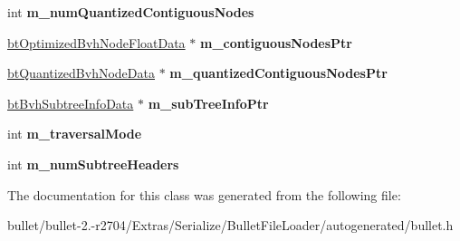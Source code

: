\begin{DoxyCompactItemize}
\item 
\hypertarget{class_bullet_1_1bt_quantized_bvh_float_data_ade2d7f0c45e9d551a5ea19a0a89d8ecf}{int {\bfseries m\+\_\+num\+Quantized\+Contiguous\+Nodes}}\label{class_bullet_1_1bt_quantized_bvh_float_data_ade2d7f0c45e9d551a5ea19a0a89d8ecf}

\item 
\hypertarget{class_bullet_1_1bt_quantized_bvh_float_data_a225ee2777bb0168863155763de4ea4e0}{\hyperlink{class_bullet_1_1bt_optimized_bvh_node_float_data}{bt\+Optimized\+Bvh\+Node\+Float\+Data} $\ast$ {\bfseries m\+\_\+contiguous\+Nodes\+Ptr}}\label{class_bullet_1_1bt_quantized_bvh_float_data_a225ee2777bb0168863155763de4ea4e0}

\item 
\hypertarget{class_bullet_1_1bt_quantized_bvh_float_data_a8ccd5c4aadbeb51c98ec626a0bd9a441}{\hyperlink{class_bullet_1_1bt_quantized_bvh_node_data}{bt\+Quantized\+Bvh\+Node\+Data} $\ast$ {\bfseries m\+\_\+quantized\+Contiguous\+Nodes\+Ptr}}\label{class_bullet_1_1bt_quantized_bvh_float_data_a8ccd5c4aadbeb51c98ec626a0bd9a441}

\item 
\hypertarget{class_bullet_1_1bt_quantized_bvh_float_data_a0315a963aab5135538c08ad21e924bb8}{\hyperlink{class_bullet_1_1bt_bvh_subtree_info_data}{bt\+Bvh\+Subtree\+Info\+Data} $\ast$ {\bfseries m\+\_\+sub\+Tree\+Info\+Ptr}}\label{class_bullet_1_1bt_quantized_bvh_float_data_a0315a963aab5135538c08ad21e924bb8}

\item 
\hypertarget{class_bullet_1_1bt_quantized_bvh_float_data_a8efbb7e26bf1f07825258ac7ca3eeaad}{int {\bfseries m\+\_\+traversal\+Mode}}\label{class_bullet_1_1bt_quantized_bvh_float_data_a8efbb7e26bf1f07825258ac7ca3eeaad}

\item 
\hypertarget{class_bullet_1_1bt_quantized_bvh_float_data_a42a9b06e2ff193db3040f4b5d2e4ce8f}{int {\bfseries m\+\_\+num\+Subtree\+Headers}}\label{class_bullet_1_1bt_quantized_bvh_float_data_a42a9b06e2ff193db3040f4b5d2e4ce8f}

\end{DoxyCompactItemize}


The documentation for this class was generated from the following file\+:\begin{DoxyCompactItemize}
\item 
bullet/bullet-\/2.-\/r2704/\+Extras/\+Serialize/\+Bullet\+File\+Loader/autogenerated/bullet.\+h\end{DoxyCompactItemize}
